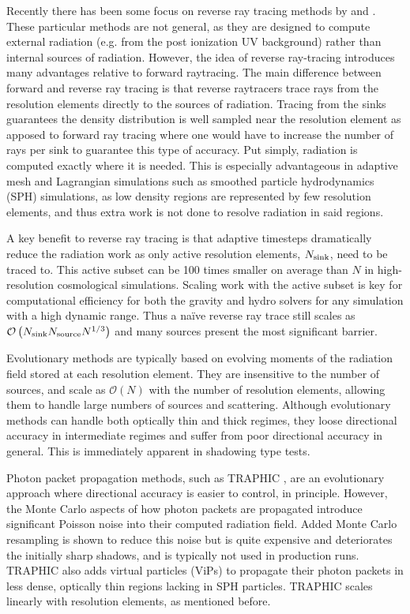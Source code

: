 \documentclass[fleq,usenatbib]{mnras}
\newcommand{\bigO}[1]{\mathcal{O}\left(#1\right)}
\newcommand{\NS}{N_{\rm source}}
\newcommand{\NK}{N_{\rm sink}}
\begin{document}
Recently there has been some focus on reverse ray tracing methods by
\cite{clarkEt12} and \cite{altayTheuns13}. These particular methods are not 
general, as they are designed to compute external radiation (e.g. from the 
post ionization UV background) rather than internal sources of radiation. 
However, the idea of reverse ray-tracing introduces many advantages relative 
to forward raytracing. The main difference between forward and reverse ray 
tracing is that reverse raytracers trace rays from the resolution elements 
directly to the sources of radiation. Tracing from the sinks guarantees the 
density distribution is well sampled near the resolution element as apposed to 
forward ray tracing where one would have to increase the number of rays per 
sink to guarantee this type of accuracy. Put simply, radiation is computed 
exactly where it is needed.  This is especially advantageous in adaptive mesh 
and Lagrangian simulations such as smoothed particle hydrodynamics (SPH) 
simulations, as low density regions are represented by few resolution 
elements, and thus extra work is not done to resolve radiation in said regions.

A key benefit to reverse ray tracing is that adaptive timesteps dramatically 
reduce the radiation work as only active resolution elements, $\NK$, need 
to be traced to. This active subset can be 100 times smaller on average than 
$N$ in high-resolution cosmological simulations. Scaling work with the active 
subset is key for computational efficiency for both the gravity and hydro 
solvers for any simulation with a high dynamic range. Thus a na\"ive reverse 
ray trace still scales as $\bigO{\NK \NS N^{1/3}}$ and many sources 
present the most significant barrier.

Evolutionary methods are typically based on evolving moments of the radiation 
field stored at each resolution element. They are insensitive to the number of 
sources, and scale as $\mathcal{O}(N)$ with the number of resolution elements, 
allowing them to handle large numbers of sources and scattering. Although 
evolutionary methods can handle both optically thin and thick regimes, they 
loose directional accuracy in intermediate regimes and suffer from poor 
directional accuracy in general. This is immediately apparent in shadowing 
type tests.

Photon packet propagation methods, such as TRAPHIC \citep{pawlikSchaye08}, are 
an evolutionary approach where directional accuracy is easier to control, in 
principle. However, the Monte Carlo aspects of how photon packets are 
propagated introduce significant Poisson noise into their computed radiation 
field. Added Monte Carlo resampling is shown to reduce this noise but is quite 
expensive and deteriorates the initially sharp shadows, and is typically not 
used in production runs. TRAPHIC also adds virtual particles (ViPs) to 
propagate their photon packets in less dense, optically thin regions lacking 
in SPH particles. TRAPHIC scales linearly with resolution elements, as 
mentioned before.
\end{document}
